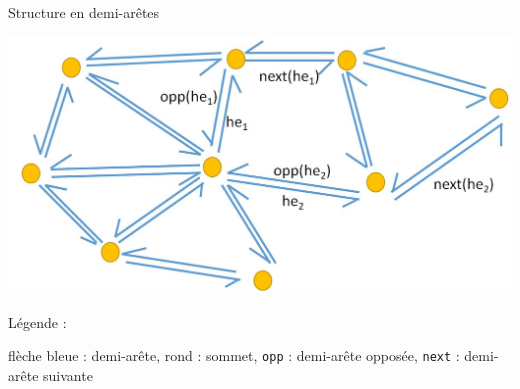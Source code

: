 \documentclass[aspectratio=169, 12pt, a4paper, hyperref={pdfauthor={Alexandre MARIN}, pdfkeywords={IFPEN, Delaunay, Voronoi, mesh generation}, colorlinks=true, linkcolor=purple, urlcolor=blue, citecolor=magenta}]{beamer}
\begin{document}
\begin{Energie}{Structure en demi-arêtes}
\begin{center}
\includegraphics[scale=0.4]{../pictures/halfEdge.jpg}

Légende :

flèche bleue : demi-arête, rond : sommet, \texttt{opp} : demi-arête opposée, \texttt{next} : demi-arête suivante
\end{center}
\end{Energie}
\end{document}
